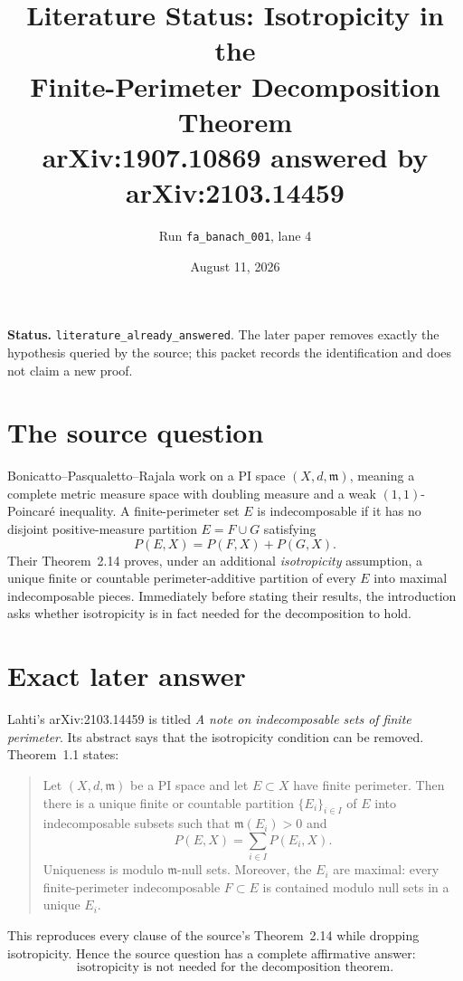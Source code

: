 \documentclass[11pt]{article}
\title{Literature Status: Isotropicity in the\\
Finite-Perimeter Decomposition Theorem\\
\large arXiv:1907.10869 answered by arXiv:2103.14459}
\author{Run \texttt{fa\_banach\_001}, lane 4}
\date{August 11, 2026}
\begin{document}
\maketitle

\textbf{Status.} \texttt{literature\_already\_answered}. The later paper
removes exactly the hypothesis queried by the source; this packet records the
identification and does not claim a new proof.

\section*{The source question}
Bonicatto--Pasqualetto--Rajala work on a PI space
$(X,d,\mathfrak m)$, meaning a complete metric measure space with doubling
measure and a weak $(1,1)$-Poincar\'e inequality. A finite-perimeter set $E$
is indecomposable if it has no disjoint positive-measure partition
$E=F\cup G$ satisfying
\[
 P(E,X)=P(F,X)+P(G,X).
\]
Their Theorem~2.14 proves, under an additional \emph{isotropicity}
assumption, a unique finite or countable perimeter-additive partition of every
$E$ into maximal indecomposable pieces. Immediately before stating their
results, the introduction asks whether isotropicity is in fact needed for the
decomposition to hold.

\section*{Exact later answer}
Lahti's arXiv:2103.14459 is titled \emph{A note on indecomposable sets of
finite perimeter}. Its abstract says that the isotropicity condition can be
removed. Theorem~1.1 states:

\begin{quote}
Let $(X,d,\mathfrak m)$ be a PI space and let $E\subset X$ have finite
perimeter. Then there is a unique finite or countable partition
$\{E_i\}_{i\in I}$ of $E$ into indecomposable subsets such that
$\mathfrak m(E_i)>0$ and
\[
 P(E,X)=\sum_{i\in I}P(E_i,X).
\]
Uniqueness is modulo $\mathfrak m$-null sets. Moreover, the $E_i$ are maximal:
every finite-perimeter indecomposable $F\subset E$ is contained modulo null
sets in a unique $E_i$.
\end{quote}

This reproduces every clause of the source's Theorem~2.14 while dropping
isotropicity. Hence the source question has a complete affirmative answer:
\[
 \boxed{\text{isotropicity is not needed for the decomposition theorem.}}
\]
\end{document}
